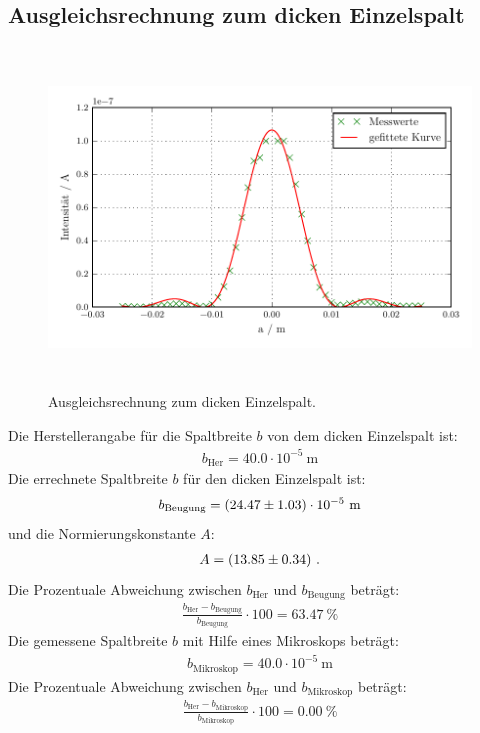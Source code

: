 \subsection{Ausgleichsrechnung zum dicken Einzelspalt}
\begin{figure}[H] %
  \centering
  \includegraphics[height=9cm]{build/plot1.pdf}
  \caption{Ausgleichsrechnung zum dicken Einzelspalt.}
  \label{fig:Einzel3}
\end{figure}

Die Herstellerangabe für die Spaltbreite $b$ von dem dicken Einzelspalt ist:
\begin{align*}
  b_\text{Her} = 40.0 \cdot 10^{-5} \ \text{m}
\end{align*}
Die errechnete Spaltbreite $b$ für den dicken Einzelspalt ist:
\begin{align*}
  b_\text{Beugung} = (\num{24.47 +- 1.03}) \cdot 10^{-5} \ \text{m}
\end{align*}
und die Normierungskonstante $A$:
\begin{align*}
  A = (\num{13.85 +- 0.34}) \ .
\end{align*}
Die Prozentuale Abweichung zwischen $b_\text{Her}$ und $b_\text{Beugung}$ beträgt:
\begin{align*}
  \frac{b_\text{Her}-b_\text{Beugung}}{b_\text{Beugung}} \cdot 100 = 63.47 \ \%
\end{align*}
Die gemessene Spaltbreite $b$ mit Hilfe eines Mikroskops beträgt:
\begin{align*}
  b_\text{Mikroskop} = 40.0 \cdot 10^{-5} \ \text{m}
\end{align*}
Die Prozentuale Abweichung zwischen $b_\text{Her}$ und $b_\text{Mikroskop}$ beträgt:
\begin{align*}
  \frac{b_\text{Her}-b_\text{Mikroskop}}{b_\text{Mikroskop}} \cdot 100 = 0.00 \ \%
\end{align*}


